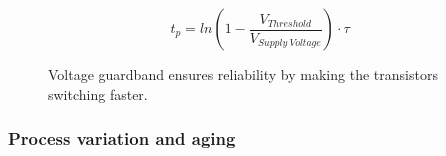 \begin{equation}
    t_p=ln(1-\frac{V_{Threshold}}{V_{Supply \: Voltage}})\cdot\tau
    \label{eq:tp_v_scaling}
\end{equation}


\begin{figure}[!htb]
    \centering
  \begin{subfigmatrix}{2}
  \end{subfigmatrix}
  \caption{Voltage guardband ensures reliability by making the transistors switching faster.}
\end{figure}




\subsubsection{Process variation and aging}

